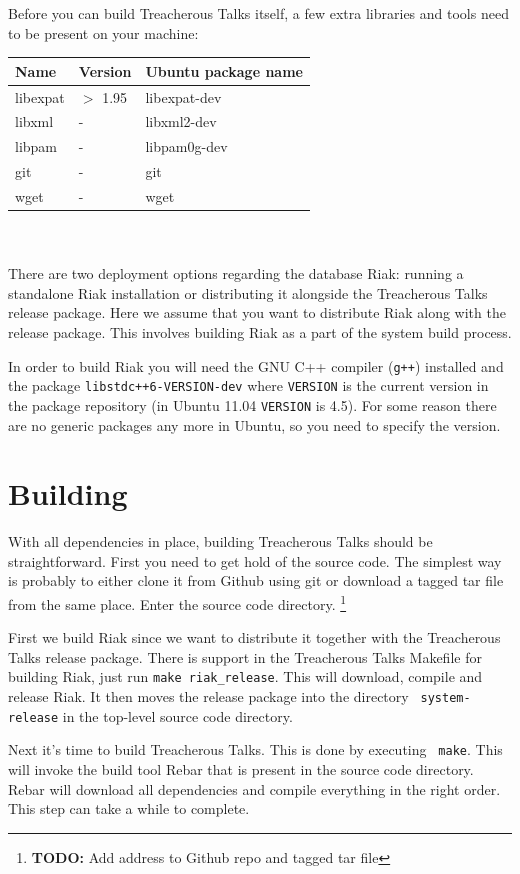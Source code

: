 \documentclass[11pt,a4paper]{report}
\newcommand{\todo}[1]{\footnote{{\color{red} {\bf TODO:} #1}}}
\begin{document}
Before you can build Treacherous Talks itself, a few extra libraries and tools
need to be present on your machine: \\

\begin{tabular}{lll}
  Name & Version & Ubuntu package name \\ \hline
  libexpat & $>$ 1.95 & libexpat-dev \\
  libxml   & -        & libxml2-dev \\
  libpam   & -        & libpam0g-dev \\
  git      & -        & git \\
  wget     & -        & wget \\
\end{tabular} \\
\\
There are two deployment options regarding the database Riak: running a
standalone Riak installation or distributing it alongside the Treacherous Talks
release package. Here we assume that you want to distribute Riak along with the
release package. This involves building Riak as a part of the system build
process.

In order to build Riak you will need the GNU C++ compiler ({\tt g++}) installed
and the package {\tt libstdc++6-VERSION-dev} where {\tt VERSION} is the current
version in the package repository (in Ubuntu 11.04 {\tt VERSION} is 4.5). For
some reason there are no generic packages any more in Ubuntu, so you need to
specify the version.
\section{Building}
With all dependencies in place, building Treacherous Talks should be
straightforward. First you need to get hold of the source code. The simplest way
is probably to either clone it from Github using git or download a tagged tar
file from the same place. Enter the source code directory.
\todo{Add address to Github repo and tagged tar file}

First we build Riak since we want to distribute it together with the Treacherous
Talks release package. There is support in the Treacherous Talks Makefile for
building Riak, just run {\tt make riak\_release}. This will download, compile
and release Riak. It then moves the release package into the directory {\tt
  system-release} in the top-level source code directory.

Next it's time to build Treacherous Talks. This is done by executing {\tt
  make}. This will invoke the build tool Rebar that is present in the source
code directory. Rebar will download all dependencies and compile everything in
the right order. This step can take a while to complete.
\end{document}
